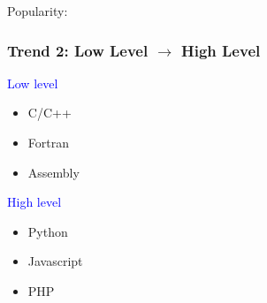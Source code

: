 \documentclass[
    xcolor={svgnames,dvipsnames},
    hyperref={colorlinks, citecolor=DeepPink4, linkcolor=DarkRed, urlcolor=DarkBlue}
    ]{beamer}  %
\newcommand{\blue}[1]{\textcolor{Blue}{\sf #1}}
\newcommand{\1}{\mathbbm 1}
\begin{document}
\begin{frame}

    Popularity:

    \begin{figure}
       \begin{center}
       \end{center}
    \end{figure}

\end{frame}


\begin{frame}
    \frametitle{Trend 2: Low Level $\to$ High Level}
    
    \blue{Low level} 
    
    \begin{itemize}
        \item C/C++
        \item Fortran
        \item Assembly
    \end{itemize}

    \vspace{1em}

    \blue{High level } 

    \begin{itemize}
        \item Python
        \item Javascript
        \item PHP
    \end{itemize}

\end{frame}
\end{document}
